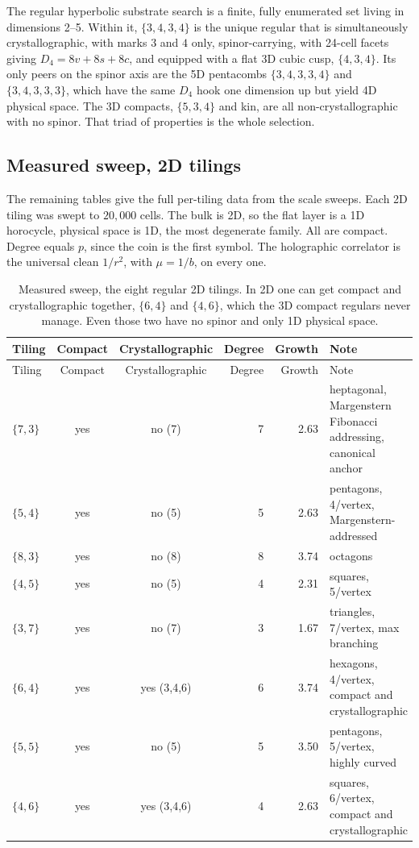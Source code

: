 The regular hyperbolic substrate search is a finite, fully enumerated set living in dimensions 2--5. Within it,
$\{3,4,3,4\}$ is the unique regular that is simultaneously crystallographic, with marks $3$ and $4$ only,
spinor-carrying, with 24-cell facets giving $D_4 = 8v + 8s + 8c$, and equipped with a flat 3D cubic cusp,
$\{4,3,4\}$. Its only peers on the spinor axis are the 5D pentacombs $\{3,4,3,3,4\}$ and $\{3,4,3,3,3\}$, which
have the same $D_4$ hook one dimension up but yield 4D physical space. The 3D compacts, $\{5,3,4\}$ and kin, are
all non-crystallographic with no spinor. That triad of properties is the whole selection.

\subsection{Measured sweep, 2D tilings}

The remaining tables give the full per-tiling data from the scale sweeps. Each 2D tiling was swept to $20{,}000$
cells. The bulk is 2D, so the flat layer is a 1D horocycle, physical space is 1D, the most degenerate family. All
are compact. Degree equals $p$, since the coin is the first symbol. The holographic correlator is the universal
clean $1/r^2$, with $\mu = 1/b$, on every one.

{\small
\begin{longtable}{l c c r r p{2.5in}}
\toprule
Tiling & Compact & Crystallographic & Degree & Growth & Note \\
\midrule
\endfirsthead
\toprule
Tiling & Compact & Crystallographic & Degree & Growth & Note \\
\midrule
\endhead
\bottomrule
\endfoot
\bottomrule
\caption{Measured sweep, the eight regular 2D tilings. In 2D one can get compact and crystallographic together,
$\{6,4\}$ and $\{4,6\}$, which the 3D compact regulars never manage. Even those two have no spinor and only 1D
physical space.}
\label{tab:sweep-2d}
\endlastfoot
$\{7,3\}$ & yes & no (7) & 7 & 2.63 & heptagonal, Margenstern Fibonacci addressing, canonical anchor \\
$\{5,4\}$ & yes & no (5) & 5 & 2.63 & pentagons, 4/vertex, Margenstern-addressed \\
$\{8,3\}$ & yes & no (8) & 8 & 3.74 & octagons \\
$\{4,5\}$ & yes & no (5) & 4 & 2.31 & squares, 5/vertex \\
$\{3,7\}$ & yes & no (7) & 3 & 1.67 & triangles, 7/vertex, max branching \\
$\{6,4\}$ & yes & yes (3,4,6) & 6 & 3.74 & hexagons, 4/vertex, compact and crystallographic \\
$\{5,5\}$ & yes & no (5) & 5 & 3.50 & pentagons, 5/vertex, highly curved \\
$\{4,6\}$ & yes & yes (3,4,6) & 4 & 2.63 & squares, 6/vertex, compact and crystallographic \\
\end{longtable}}

